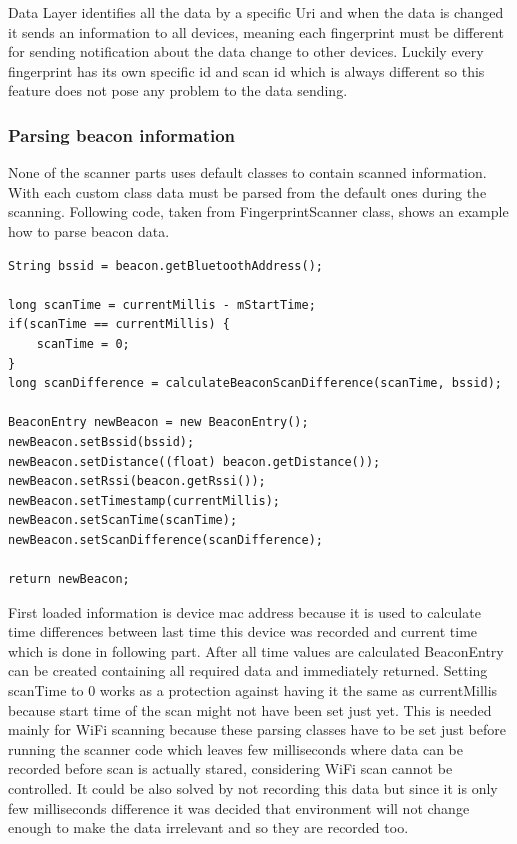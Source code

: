 Data Layer identifies all the data by a specific Uri and when the data is changed it sends an information to all devices, meaning each fingerprint must be different for sending notification about the data change to other devices. Luckily every fingerprint has its own specific id and scan id which is always different so this feature does not pose any problem to the data sending.

\subsubsection{Parsing beacon information}\label{subsubsec:ParsingBeaconInformation}
None of the scanner parts uses default classes to contain scanned information. With each custom class data must be parsed from the default ones during the scanning. Following code, taken from FingerprintScanner class, shows an example how to parse beacon data.

\begin{lstlisting}[caption=Parsing beacon information]
String bssid = beacon.getBluetoothAddress();

long scanTime = currentMillis - mStartTime;
if(scanTime == currentMillis) {
	scanTime = 0;
}
long scanDifference = calculateBeaconScanDifference(scanTime, bssid);

BeaconEntry newBeacon = new BeaconEntry();
newBeacon.setBssid(bssid);
newBeacon.setDistance((float) beacon.getDistance());
newBeacon.setRssi(beacon.getRssi());
newBeacon.setTimestamp(currentMillis);
newBeacon.setScanTime(scanTime);
newBeacon.setScanDifference(scanDifference);

return newBeacon;
\end{lstlisting}

First loaded information is device mac address because it is used to calculate time differences between last time this device was recorded and current time which is done in following part. After all time values are calculated BeaconEntry can be created containing all required data and immediately returned. Setting scanTime to 0 works as a protection against having it the same as currentMillis because start time of the scan might not have been set just yet. This is needed mainly for WiFi scanning because these parsing classes have to be set just before running the scanner code which leaves few milliseconds where data can be recorded before scan is actually stared, considering WiFi scan cannot be controlled. It could be also solved by not recording this data but since it is only few milliseconds difference it was decided that environment will not change enough to make the data irrelevant and so they are recorded too.

